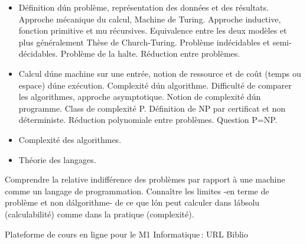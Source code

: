{
\begin{itemize}
\item Définition d\'un problème, représentation des données et des résultats. Approche mécanique du calcul, Machine de Turing. Approche inductive, fonction primitive et mu récursives. Equivalence entre les deux modèles et plus généralement Thèse de Church-Turing. Problème indécidables et semi-décidables. Problème de la halte. Réduction entre problèmes.
\item Calcul d\'une machine sur une entrée, notion de ressource et de coût (temps ou espace) d\'une exécution. Complexité d\'un algorithme. Difficulté de comparer les algorithmes, approche asymptotique. Notion de complexité d\'un programme. Class de complexité P. Définition de NP par certificat et non déterministe. Réduction polynomiale entre problèmes. Question P=NP.
\end{itemize} 
} 
{\begin{itemize}
\item Complexité des algorithmes.
\item Théorie des langages.
\end{itemize} 
} 
{\begin{itemize}
\ObjItem Comprendre la relative indifférence des problèmes par rapport à une machine comme un langage de programmation.
\ObjItem Connaître les limites -en terme de problème et non d\'algorithme- de ce que l\'on peut calculer dans l\'absolu (calculabilité) comme dans la pratique (complexité).
\end{itemize} 
} 
{Plateforme de cours en ligne pour le M1 Informatique\,: URL} 
{Biblio} 
 
\vfill

